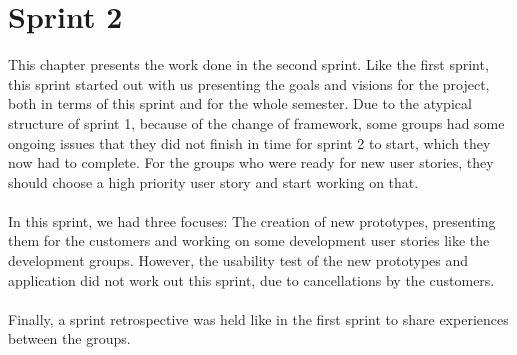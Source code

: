 \chapter{Sprint 2}
This chapter presents the work done in the second sprint.
Like the first sprint, this sprint started out with us presenting the goals and visions for the project, both in terms of this sprint and for the whole semester.
Due to the atypical structure of sprint 1, because of the change of framework, some groups had some ongoing issues that they did not finish in time for sprint 2 to start, which they now had to complete.
For the groups who were ready for new user stories, they should choose a high priority user story and start working on that.
\\\\
In this sprint, we had three focuses: The creation of new prototypes, presenting them for the customers and working on some development user stories like the development groups.
However, the usability test of the new prototypes and application did not work out this sprint, due to cancellations by the customers. 
\\\\
Finally, a sprint retrospective was held like in the first sprint to share experiences between the groups.